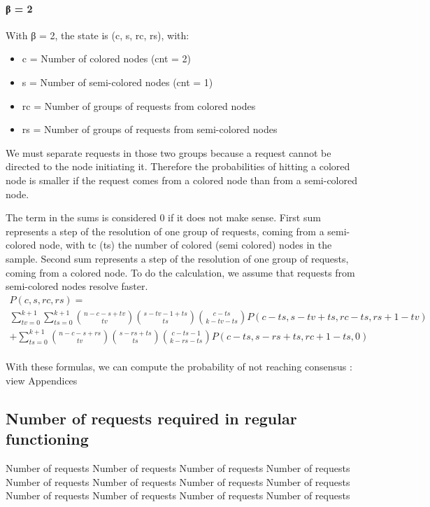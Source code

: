 \documentclass[11pt, twocolumn]{article}
\begin{document}
\paragraph{β = 2}
With β = 2, the state is (c, s, rc, rs), with:
\begin{itemize}
    \item c = Number of colored nodes (cnt = 2)
    \item s = Number of semi-colored nodes (cnt = 1)
    \item rc = Number of groups of requests from colored nodes
    \item rs = Number of groups of requests from semi-colored nodes
\end{itemize}

We must separate requests in those two groups because a request cannot be directed to the node initiating it. 
Therefore the probabilities of hitting a colored node is smaller if the request comes from a colored node than from a semi-colored node.

The term in the sums is considered 0 if it does not make sense.
First sum represents a step of the resolution of one group of requests, coming from a semi-colored node, with tc (ts) the number of colored (semi colored) nodes in the sample.
Second sum represents a step of the resolution of one group of requests, coming from a colored node. 
To do the calculation, we assume that requests from semi-colored nodes resolve faster.
\begin{multline*}
    P(c, s, rc, rs) = \\ \sum_{tv=0}^{k+1}\sum_{ts=0}^{k+1} {n-c-s+tv \choose tv}{s-tv-1+ts \choose ts}{c-ts \choose k-tv-ts}P(c-ts, s-tv+ts, rc-ts, rs+1-tv)
    \\ + \sum_{ts=0}^{k+1} {n-c-s+rs \choose tv}{s-rs+ts \choose ts}{c-ts-1 \choose k-rs-ts}P(c-ts, s-rs+ts, rc+1-ts, 0)
\end{multline*}
\\
With these formulas, we can compute the probability of not reaching consensus : view Appendices

\subsection{Number of requests required in regular functioning}

Number of requests
Number of requests
Number of requests
Number of requests
Number of requests
Number of requests
Number of requests
Number of requests
Number of requests
Number of requests
Number of requests
Number of requests
\end{document}
